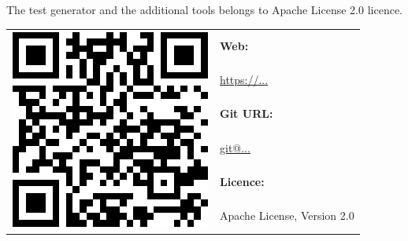 \appendix
\chapter*{\fuggelek}
\label{cha:appendix}

\setcounter{chapter}{6}  %
\setcounter{equation}{0} %

The test generator and the additional tools belongs to Apache License 2.0 licence.

\begin{table}[htb]
\begin{center}
\begin{tabular}{cl}
\multirow{6}{*}{\includegraphics[scale=0.3]{figures/qrcode.png}}
& \textbf{Web:} \\
& \url{https://...} \\
& \textbf{Git URL:} \\
& \url{git@...} \\
& \textbf{Licence:} \\
& Apache License, Version 2.0 \\
\end{tabular}
\end{center}
\end{table}

